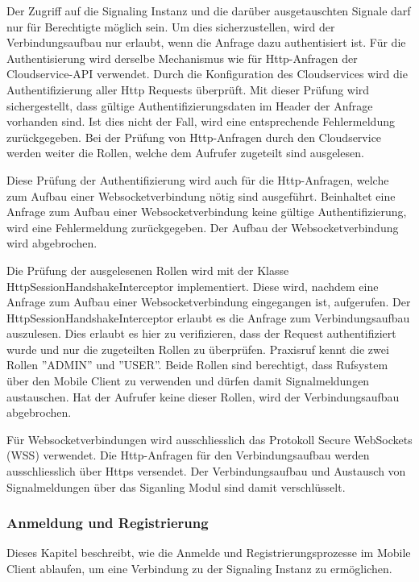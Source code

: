 Der Zugriff auf die Signaling Instanz und die darüber ausgetauschten Signale darf nur für Berechtigte möglich sein.
Um dies sicherzustellen, wird der Verbindungsaufbau nur erlaubt, wenn die Anfrage dazu authentisiert ist.
Für die Authentisierung wird derselbe Mechanismus wie für Http-Anfragen der Cloudservice-API verwendet.
Durch die Konfiguration des Cloudservices wird die Authentifizierung aller Http Requests überprüft.
Mit dieser Prüfung wird sichergestellt, dass gültige Authentifizierungsdaten im Header der Anfrage vorhanden sind.
Ist dies nicht der Fall, wird eine entsprechende Fehlermeldung zurückgegeben.
Bei der Prüfung von Http-Anfragen durch den Cloudservice werden weiter die Rollen, welche dem Aufrufer zugeteilt sind ausgelesen.

Diese Prüfung der Authentifizierung wird auch für die Http-Anfragen, welche zum Aufbau einer Websocketverbindung nötig sind ausgeführt.
Beinhaltet eine Anfrage zum Aufbau einer Websocketverbindung keine gültige Authentifizierung, wird eine Fehlermeldung zurückgegeben.
Der Aufbau der Websocketverbindung wird abgebrochen.

Die Prüfung der ausgelesenen Rollen wird mit der Klasse HttpSessionHandshakeInterceptor implementiert.
Diese wird, nachdem eine Anfrage zum Aufbau einer Websocketverbindung eingegangen ist, aufgerufen.
Der HttpSessionHandshakeInterceptor erlaubt es die Anfrage zum Verbindungsaufbau auszulesen.
Dies erlaubt es hier zu verifizieren, dass der Request authentifiziert wurde und nur die zugeteilten Rollen zu überprüfen.
Praxisruf kennt die zwei Rollen ''ADMIN'' und ''USER''.
Beide Rollen sind berechtigt, dass Rufsystem über den Mobile Client zu verwenden und dürfen damit Signalmeldungen austauschen.
Hat der Aufrufer keine dieser Rollen, wird der Verbindungsaufbau abgebrochen.

Für Websocketverbindungen wird ausschliesslich das Protokoll Secure WebSockets (WSS) verwendet.
Die Http-Anfragen für den Verbindungsaufbau werden ausschliesslich über Https versendet.
Der Verbindungsaufbau und Austausch von Signalmeldungen über das Siganling Modul sind damit verschlüsselt.

\clearpage

\subsubsection{Anmeldung und Registrierung}

Dieses Kapitel beschreibt, wie die Anmelde und Registrierungsprozesse im Mobile Client ablaufen, um eine Verbindung zu der Signaling Instanz zu ermöglichen.

